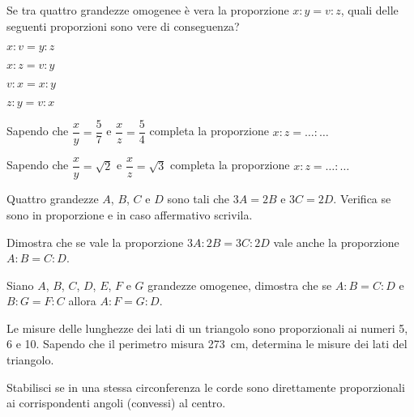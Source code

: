 \begin{multicols}{2}

\begin{esercizio}
\label{ese:6.13}
Se tra quattro grandezze omogenee è vera la proporzione $x : y = v : z$, quali delle seguenti proporzioni sono vere di conseguenza?
\begin{enumeratea}
\item $x : v = y : z$
\item $x : z = v : y$
\item $v : x = x : y$
\item $z : y = v : x$
\end{enumeratea}
\end{esercizio}

\begin{esercizio}
\label{ese:6.14}
Sapendo che $\dfrac{x}{y}=\dfrac{5}{7}$ e $\dfrac{x}{z}=\dfrac{5}{4}$ completa la proporzione $x : z = \ldots{} : \ldots{}$
\end{esercizio}

\begin{esercizio}
\label{ese:6.15}
Sapendo che $\dfrac{x}{y}=\sqrt{2}$ e $\dfrac{x}{z}=\sqrt{3}$ completa la proporzione $x : z = \ldots{} : \ldots{}$
\end{esercizio}

\begin{esercizio}
\label{ese:6.16}
Quattro grandezze $A$, $B$, $C$ e $D$ sono tali che $3A=2B$ e $3C=2D$. Verifica se sono in proporzione e in caso affermativo scrivila.
\end{esercizio}

\begin{esercizio}
\label{ese:6.17}
Dimostra che se vale la proporzione $3A : 2B = 3C : 2D$ vale anche la proporzione $A : B = C : D$.
\end{esercizio}

\begin{esercizio}
\label{ese:6.18}
Siano $A$, $B$, $C$, $D$, $E$, $F$ e $G$ grandezze omogenee, dimostra che se $A : B = C : D$ e $B : G = F : C$ allora $A : F = G : D$.
\end{esercizio}

\begin{esercizio}
\label{ese:6.19}
Le misure delle lunghezze dei lati di un triangolo sono proporzionali ai numeri 5, 6 e 10. Sapendo che il perimetro misura 273~cm, determina le misure dei lati del triangolo.
\end{esercizio}

\begin{esercizio}
\label{ese:6.20}
Stabilisci se in una stessa circonferenza le corde sono direttamente proporzionali ai corrispondenti angoli (convessi) al centro.
\end{esercizio}


\end{multicols}
